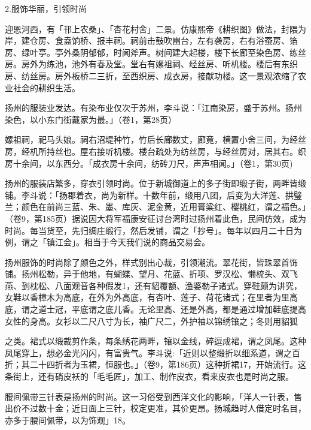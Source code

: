 2.服饰华丽，引领时尚

迎恩河西，有「邗上农桑」、「杏花村舍」二景。仿康熙帝《耕织图》做法，封隈为岸，建仓房、食盍饷桥、报丰祠。祠前击鼓吹豳台，左有袭房，右有浴蚕房、箔房、绿叶亭。亭外桑阴郁郁，时闻斧声。树间建大起楼，楼下长廊至染色房、练丝房。房外为练池，池外有春及堂。堂右有嫘祖祠、经丝房、听机楼。楼后有东织房、纺丝房。房外板桥二三折，至西织房、成衣房，接献功楼。这一景观浓缩了农业社会的耕织生活。

扬州的服装业发达。有染布业仅次于苏州，李斗说：「江南染房，盛于苏州。扬州染色，以小东门街戴家为最。」（卷1，第28页）

嫘祖祠，祀马头娘。祠右沼堤种竹，竹后长廊数丈，廊竟，横置小舍三间，为经丝房，经机所持丝也。屋右接听机楼。楼台疏处为纺丝房，与经丝房对，居其右。织房十余间，以东西分。「成衣房十余间，纺砖刀尺，声声相闻。」（卷1，第30页)

扬州的服装店繁多，穿衣引领时尚。位于新城御道上的多子街即缎子街，两畔皆缎铺。李斗说：「扬郡着衣，尚为新样。十数年前，缎用八团，后变为大洋莲、拱璧兰；颜色在前尚三蓝、朱、墨、库灰、泥金黄，近用膏粱红、樱桃红，谓之福色。」（卷9，第185页）据说因大将军福康安征讨台湾时过扬州着此色，民间仿效，成为时尚。每当货至，先归绸庄缎行，然后发铺，谓之「抄号」。每年以四月二十日为例，谓之「镇江会」。相当于今天我们说的商品交易会。

扬州服饰的时尚除了颜色之外，样式别出心裁，引领潮流。翠花街，皆珠翠首饰铺。扬州松勒，异于他地，有蝴蝶、望月、花蓝、折项、罗汉松、懒梳头、双飞燕、到枕松、八面观音各种假发1，还有貂覆额、渔婆勒子诸式。穿鞋颇为讲究，女鞋以香樟木为高底，在外为外高底，有杏叶、莲子、荷花诸式；在里者为里高底，谓之道士冠，平底谓之底儿香。无论里高、还是外高，都是通过增加鞋底提高女性的身高。女衫以二尺八寸为长，袖广尺二，外护袖以锦绣镶之；冬则用貂狐

\vfill
\begin{BookNotes}
\end{BookNotes}

\noindent 之类。裙式以缎裁剪作条，每条绣花两畔，镶以金线，碎逗成裙，谓之凤尾。这种凤尾穿上，想必金光闪闪，有富贵气。李斗说:「近则以整缎折以细系道，谓之百折；其二十四折者为玉裙，恒服也。」（卷9，第186页）这种折裙17，开始流行。这条街上，还有硝皮袄的「毛毛匠」，加工、制作皮衣，看来皮衣也是时尚之服。

腰间佩带三针表是扬州的时尚。这一习俗受到西洋文化的影响，「洋人一针表，售出价不过数十金；近日面上三针，校定更准，其价更昂。扬城趋时人借定时名目，亦多于腰间佩带，以为饰观」18。


